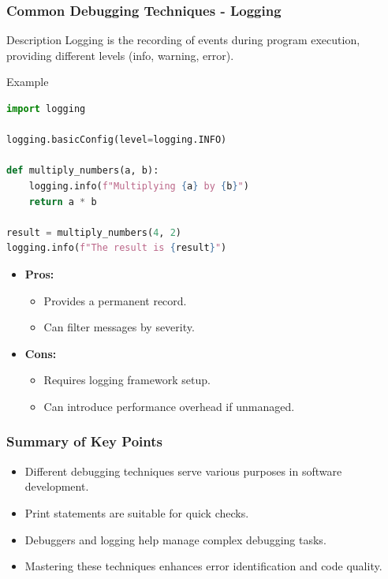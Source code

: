 \documentclass{beamer}
\begin{document}
\begin{frame}[fragile]
    \frametitle{Common Debugging Techniques - Logging}
    \begin{block}{Description}
        Logging is the recording of events during program execution, providing different levels (info, warning, error).
    \end{block}
    
    \begin{block}{Example}
        \begin{lstlisting}[language=Python]
import logging

logging.basicConfig(level=logging.INFO)

def multiply_numbers(a, b):
    logging.info(f"Multiplying {a} by {b}")
    return a * b

result = multiply_numbers(4, 2)
logging.info(f"The result is {result}")
        \end{lstlisting}
    \end{block}

    \begin{itemize}
        \item \textbf{Pros:}
        \begin{itemize}
            \item Provides a permanent record.
            \item Can filter messages by severity.
        \end{itemize}
        \item \textbf{Cons:}
        \begin{itemize}
            \item Requires logging framework setup.
            \item Can introduce performance overhead if unmanaged.
        \end{itemize}
    \end{itemize}
\end{frame}

\begin{frame}[fragile]
    \frametitle{Summary of Key Points}
    \begin{itemize}
        \item Different debugging techniques serve various purposes in software development.
        \item Print statements are suitable for quick checks.
        \item Debuggers and logging help manage complex debugging tasks.
        \item Mastering these techniques enhances error identification and code quality.
    \end{itemize}
\end{frame}
\end{document}
